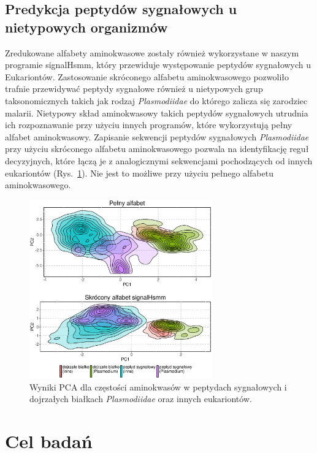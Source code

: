 \documentclass{article}
\begin{document}
\subsection{Predykcja peptydów sygnałowych u nietypowych organizmów}

Zredukowane alfabety aminokwasowe zostały również wykorzystane w 
naszym programie signalHsmm, który przewiduje występowanie peptydów sygnałowych 
u Eukariontów. Zastosowanie skróconego alfabetu aminokwasowego pozwoliło 
trafnie przewidywać peptydy sygnałowe również u nietypowych grup taksonomicznych 
takich jak rodzaj \textit{Plasmodiidae} do którego zalicza się zarodziec 
malarii. Nietypowy skład aminokwasowy takich peptydów sygnałowych utrudnia ich 
rozpoznawanie przy użyciu innych programów, które wykorzystują pełny alfabet 
aminokwasowy. Zapisanie sekwencji peptydów sygnałowych \textit{Plasmodiidae} 
przy użyciu skróconego alfabetu aminokwasowego pozwala na identyfikację reguł 
decyzyjnych, które łączą je z analogicznymi sekwencjami pochodzących od innych 
eukariontów (Rys.~\ref{fig:PCA}). Nie jest to możliwe przy użyciu pełnego 
alfabetu aminokwasowego.

\begin{figure}[htbp]
\centering
\includegraphics[width=0.7\textwidth]{signalHsmm.eps}
\caption{Wyniki PCA dla częstości aminokwasów w peptydach sygnałowych i 
dojrzałych białkach \textit{Plasmodiidae} oraz innych eukariontów.}
\label{fig:PCA}
\end{figure}


\section{Cel badań}
\end{document}

